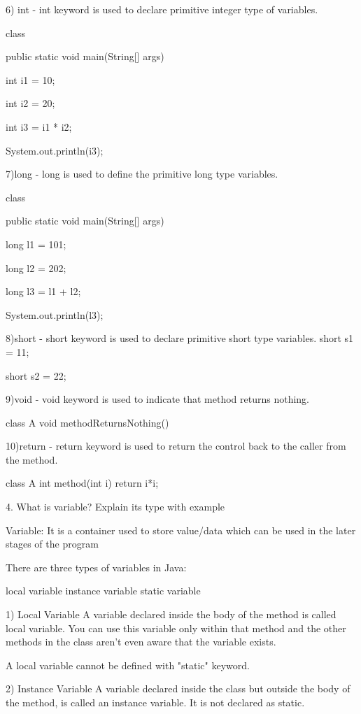 6) int - int keyword is used to declare primitive integer type of variables.


    class {
    public static void main(String[] args) 
    {
        int i1 = 10;
         
        int i2 = 20;
         
        int i3 = i1 *  i2;
         
        System.out.println(i3);
    }
}

7)long - long is used to define the primitive long type variables.

class {
    public static void main(String[] args) 
    {
        long l1 = 101;
         
        long l2 = 202;
         
        long l3 = l1 +  l2;
         
        System.out.println(l3);
    }
}

8)short - short keyword is used to declare primitive short type variables.
    short s1 = 11;
         
    short s2 = 22;
	
	
9)void - void keyword is used to indicate that method returns nothing.

class A
{
    void methodReturnsNothing(){
    }
}



10)return - return keyword is used to return the control back to the caller from the method.

class A
{
    int method(int i)
    {
        return i*i;    
    }
}



 4. What is variable? Explain its type with example
 
Variable: It is a container used to store value/data which can be used in the later stages of the  program


There are three types of variables in Java:

local variable
instance variable
static variable



1) Local Variable
A variable declared inside the body of the method is called local variable. You can use this variable only within that method and the other methods in the class aren't even aware that the variable exists.

A local variable cannot be defined with "static" keyword.

2) Instance Variable
A variable declared inside the class but outside the body of the method, is called an instance variable. It is not declared as static.

